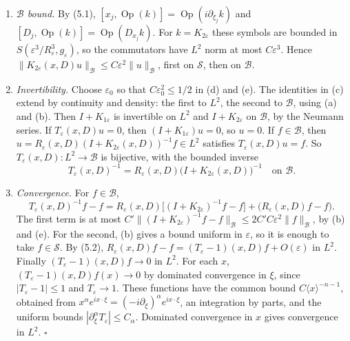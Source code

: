 \documentclass[
  11pt,
]{article}
\begin{document}
\begin{enumerate}
  \emph{\(L^2\) bounds.} For \(k\) bounded in
  \(S(\varepsilon^2/R_\varepsilon^2,g_\varepsilon)\),
  \(|D^mk(X)[T_1,\dots,T_m]|\le C_m\varepsilon^2R_\varepsilon^{-2}\prod_i(\varepsilon|T_i|/R_\varepsilon)\le C_m\varepsilon^2\prod_i|T_i|\).
  By Fact 1.5,
  \(\|K_{j\varepsilon}(x,D)\|_{L^2\to L^2}\le C\varepsilon^2\).
\item
  \emph{\(\mathcal B\) bound.} By (5.1),
  \([x_j,\operatorname{Op}(k)]=\operatorname{Op}(i\partial_{\xi_j}k)\)
  and \([D_j,\operatorname{Op}(k)]=\operatorname{Op}(D_{x_j}k)\). For
  \(k=K_{2\varepsilon}\) these symbols are bounded in
  \(S(\varepsilon^3/R_\varepsilon^3,g_\varepsilon)\), so the commutators
  have \(L^2\) norm at most \(C\varepsilon^3\). Hence
  \(\|K_{2\varepsilon}(x,D)u\|_{\mathcal B}\le C\varepsilon^2\|u\|_{\mathcal B}\),
  first on \(\mathcal S\), then on \(\mathcal B\).
\item
  \emph{Invertibility.} Choose \(\varepsilon_0\) so that
  \(C\varepsilon_0^2\le1/2\) in (d) and (e). The identities in (c)
  extend by continuity and density: the first to \(L^2\), the second to
  \(\mathcal B\), using (a) and (b). Then \(I+K_{1\varepsilon}\) is
  invertible on \(L^2\) and \(I+K_{2\varepsilon}\) on \(\mathcal B\), by
  the Neumann series. If \(T_\varepsilon(x,D)u=0\), then
  \((I+K_{1\varepsilon})u=0\), so \(u=0\). If \(f\in\mathcal B\), then
  \(u=R_\varepsilon(x,D)(I+K_{2\varepsilon}(x,D))^{-1}f\in L^2\)
  satisfies \(T_\varepsilon(x,D)u=f\). So
  \(T_\varepsilon(x,D):L^2\to\mathcal B\) is bijective, with the bounded
  inverse \[
T_\varepsilon(x,D)^{-1}=R_\varepsilon(x,D)\bigl(I+K_{2\varepsilon}(x,D)\bigr)^{-1}\quad\text{on }\mathcal B .
\]
\item
  \emph{Convergence.} For \(f\in\mathcal B\), \[
T_\varepsilon(x,D)^{-1}f-f=R_\varepsilon(x,D)\bigl[(I+K_{2\varepsilon})^{-1}f-f\bigr]+\bigl(R_\varepsilon(x,D)f-f\bigr).
\] The first term is at most
  \(C'\|(I+K_{2\varepsilon})^{-1}f-f\|_{\mathcal B}\le2C'C\varepsilon^2\|f\|_{\mathcal B}\),
  by (b) and (e). For the second, (b) gives a bound uniform in
  \(\varepsilon\), so it is enough to take \(f\in\mathcal S\). By (5.2),
  \(R_\varepsilon(x,D)f-f=(T_\varepsilon-1)(x,D)f+O(\varepsilon)\) in
  \(L^2\). Finally \((T_\varepsilon-1)(x,D)f\to0\) in \(L^2\). For each
  \(x\), \((T_\varepsilon-1)(x,D)f(x)\to0\) by dominated convergence in
  \(\xi\), since \(|T_\varepsilon-1|\le1\) and \(T_\varepsilon\to1\).
  These functions have the common bound \(C\langle x\rangle^{-n-1}\),
  obtained from
  \(x^\alpha e^{ix\cdot\xi}=(-i\partial_\xi)^\alpha e^{ix\cdot\xi}\), an
  integration by parts, and the uniform bounds
  \(|\partial_\xi^\alpha T_\varepsilon|\le C_\alpha\). Dominated
  convergence in \(x\) gives convergence in \(L^2\). \(\square\)
\end{enumerate}
\end{document}
